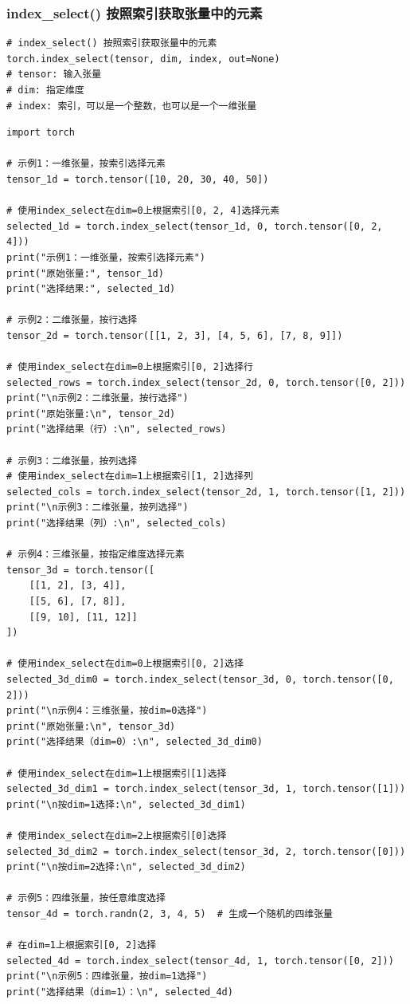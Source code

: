 \subsubsection{index\_select() 按照索引获取张量中的元素}
\label{subsubsec:Pytorch-index_select}
\begin{lstlisting}[style=demostyle,numbers=none]
# index_select() 按照索引获取张量中的元素
torch.index_select(tensor, dim, index, out=None)
# tensor: 输入张量
# dim: 指定维度
# index: 索引，可以是一个整数，也可以是一个一维张量
\end{lstlisting}
\begin{lstlisting}[style=pythonstyle]
import torch

# 示例1：一维张量，按索引选择元素
tensor_1d = torch.tensor([10, 20, 30, 40, 50])

# 使用index_select在dim=0上根据索引[0, 2, 4]选择元素
selected_1d = torch.index_select(tensor_1d, 0, torch.tensor([0, 2, 4]))
print("示例1：一维张量，按索引选择元素")
print("原始张量:", tensor_1d)
print("选择结果:", selected_1d)

# 示例2：二维张量，按行选择
tensor_2d = torch.tensor([[1, 2, 3], [4, 5, 6], [7, 8, 9]])

# 使用index_select在dim=0上根据索引[0, 2]选择行
selected_rows = torch.index_select(tensor_2d, 0, torch.tensor([0, 2]))
print("\n示例2：二维张量，按行选择")
print("原始张量:\n", tensor_2d)
print("选择结果（行）:\n", selected_rows)

# 示例3：二维张量，按列选择
# 使用index_select在dim=1上根据索引[1, 2]选择列
selected_cols = torch.index_select(tensor_2d, 1, torch.tensor([1, 2]))
print("\n示例3：二维张量，按列选择")
print("选择结果（列）:\n", selected_cols)

# 示例4：三维张量，按指定维度选择元素
tensor_3d = torch.tensor([
    [[1, 2], [3, 4]],
    [[5, 6], [7, 8]],
    [[9, 10], [11, 12]]
])

# 使用index_select在dim=0上根据索引[0, 2]选择
selected_3d_dim0 = torch.index_select(tensor_3d, 0, torch.tensor([0, 2]))
print("\n示例4：三维张量，按dim=0选择")
print("原始张量:\n", tensor_3d)
print("选择结果（dim=0）:\n", selected_3d_dim0)

# 使用index_select在dim=1上根据索引[1]选择
selected_3d_dim1 = torch.index_select(tensor_3d, 1, torch.tensor([1]))
print("\n按dim=1选择:\n", selected_3d_dim1)

# 使用index_select在dim=2上根据索引[0]选择
selected_3d_dim2 = torch.index_select(tensor_3d, 2, torch.tensor([0]))
print("\n按dim=2选择:\n", selected_3d_dim2)

# 示例5：四维张量，按任意维度选择
tensor_4d = torch.randn(2, 3, 4, 5)  # 生成一个随机的四维张量

# 在dim=1上根据索引[0, 2]选择
selected_4d = torch.index_select(tensor_4d, 1, torch.tensor([0, 2]))
print("\n示例5：四维张量，按dim=1选择")
print("选择结果（dim=1）：\n", selected_4d)
\end{lstlisting}
